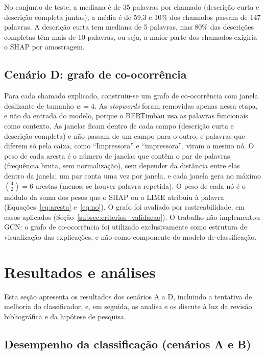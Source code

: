 \documentclass[
    12pt,                %
    openright,           %
    oneside,             %
    a4paper,             %
    english,             %
    brazil               %
]{abntex2}
\begin{document}
No conjunto de teste, a mediana é de 35 palavras por chamado (descrição curta e descrição completa juntas), a média é de 59,3 e 10\% dos chamados passam de 147 palavras. A descrição curta tem mediana de 5 palavras, mas 80\% das descrições completas têm mais de 10 palavras, ou seja, a maior parte dos chamados exigiria o SHAP por amostragem.

\subsection{Cenário D: grafo de co-ocorrência}
\label{subsec:cenario_d}

Para cada chamado explicado, construiu-se um grafo de co-ocorrência com janela deslizante de tamanho $w = 4$. As \textit{stopwords} foram removidas apenas nessa etapa, e não da entrada do modelo, porque o BERTimbau usa as palavras funcionais como contexto. As janelas ficam dentro de cada campo (descrição curta e descrição completa) e não passam de um campo para o outro, e palavras que diferem só pela caixa, como ``Impressora'' e ``impressora'', viram o mesmo nó. O peso de cada aresta é o número de janelas que contêm o par de palavras (frequência bruta, sem normalização), sem depender da distância entre elas dentro da janela; um par conta uma vez por janela, e cada janela gera no máximo $\binom{4}{2} = 6$ arestas (menos, se houver palavra repetida). O peso de cada nó é o módulo da soma dos pesos que o SHAP ou o LIME atribuiu à palavra (Equações~\ref{eq:aresta} e~\ref{eq:no}). O grafo foi avaliado por rastreabilidade, em casos aplicados (Seção~\ref{subsec:criterios_validacao}). O trabalho não implementou GCN: o grafo de co-ocorrência foi utilizado exclusivamente como estrutura de visualização das explicações, e não como componente do modelo de classificação.


\section{Resultados e análises}
\label{sec:resultados}

Esta seção apresenta os resultados dos cenários A a D, incluindo a tentativa de melhoria do classificador, e, em seguida, os analisa e os discute à luz da revisão bibliográfica e da hipótese de pesquisa.

\subsection{Desempenho da classificação (cenários A e B)}
\label{subsec:res_classificacao}
\end{document}
